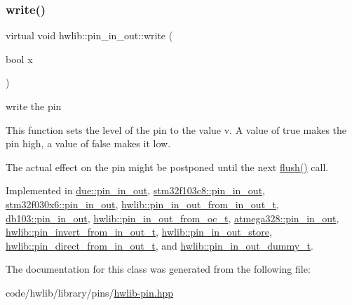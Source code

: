 \subsubsection{\texorpdfstring{write()}{write()}}
{\footnotesize\ttfamily virtual void hwlib\+::pin\+\_\+in\+\_\+out\+::write (\begin{DoxyParamCaption}\item[{bool}]{x }\end{DoxyParamCaption})\hspace{0.3cm}{\ttfamily [pure virtual]}}

write the pin

This function sets the level of the pin to the value v. A value of true makes the pin high, a value of false makes it low.

The actual effect on the pin might be postponed until the next \hyperlink{classhwlib_1_1pin__in__out_a5207c9e30f0c88e4c052952397c2da88}{flush()} call. 

Implemented in \hyperlink{classdue_1_1pin__in__out_aa6782f78c09d67ce8ded0aaf3e4f5c02}{due\+::pin\+\_\+in\+\_\+out}, \hyperlink{classstm32f103c8_1_1pin__in__out_ad8ae1c5cbeb418a79de579a3a2386310}{stm32f103c8\+::pin\+\_\+in\+\_\+out}, \hyperlink{classstm32f030x6_1_1pin__in__out_a395ac1700d5df47ef841ae4405837e1d}{stm32f030x6\+::pin\+\_\+in\+\_\+out}, \hyperlink{classhwlib_1_1pin__in__out__from__in__out__t_a20e982d8706e7a45e5d622c54602c87e}{hwlib\+::pin\+\_\+in\+\_\+out\+\_\+from\+\_\+in\+\_\+out\+\_\+t}, \hyperlink{classdb103_1_1pin__in__out_a45dcb3f770c432ece4374fcc428ee2e7}{db103\+::pin\+\_\+in\+\_\+out}, \hyperlink{classhwlib_1_1pin__in__out__from__oc__t_aeba3375851126ed813762bc16fee057c}{hwlib\+::pin\+\_\+in\+\_\+out\+\_\+from\+\_\+oc\+\_\+t}, \hyperlink{classatmega328_1_1pin__in__out_a2d6c30a028b57e2278e0f0024ba25460}{atmega328\+::pin\+\_\+in\+\_\+out}, \hyperlink{classhwlib_1_1pin__invert__from__in__out__t_a6569f8c7c0b1591cc61d1b76736dec76}{hwlib\+::pin\+\_\+invert\+\_\+from\+\_\+in\+\_\+out\+\_\+t}, \hyperlink{classhwlib_1_1pin__in__out__store_a8328b4207d39521fe525d710cc4bf800}{hwlib\+::pin\+\_\+in\+\_\+out\+\_\+store}, \hyperlink{classhwlib_1_1pin__direct__from__in__out__t_a7ef2a3bd8396c92428e353897ab52442}{hwlib\+::pin\+\_\+direct\+\_\+from\+\_\+in\+\_\+out\+\_\+t}, and \hyperlink{classhwlib_1_1pin__in__out__dummy__t_ae5ed2ec46aee911a4c3827688cbf72b8}{hwlib\+::pin\+\_\+in\+\_\+out\+\_\+dummy\+\_\+t}.



The documentation for this class was generated from the following file\+:\begin{DoxyCompactItemize}
\item 
code/hwlib/library/pins/\hyperlink{hwlib-pin_8hpp}{hwlib-\/pin.\+hpp}\end{DoxyCompactItemize}
